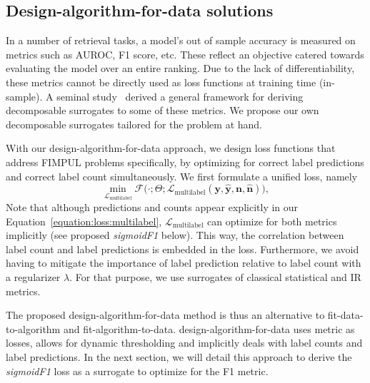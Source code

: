 \subsection{Design-algorithm-for-data solutions}
\label{section:background:solution}

In a number of retrieval tasks, a model's out of sample accuracy is measured
on metrics such as AUROC, F1 score, etc. These reflect an objective catered
towards evaluating the model over an entire ranking. Due to the lack of
differentiability, these metrics cannot be directly used as loss functions at
training time (in-sample). A seminal study~\cite{optimizableLosses} derived a
general framework for deriving decomposable surrogates to some of these
metrics. We propose our own decomposable surrogates tailored for the problem
at hand.

With our design-algorithm-for-data approach, we design loss functions that address FIMPUL problems specifically, by optimizing for correct label predictions and correct label count simultaneously.
We first formulate a unified loss, namely
%
\begin{equation}
\label{equation:loss:multilabel}
\underset{\mathcal{L}_{\text {multilabel}}} {\min} \mathcal{F}\big(\cdot ;
\Theta; \mathcal{L}_{\text {multilabel}} (\mathbf{y}, \hat{\mathbf{y}},
\mathbf{n}, \hat{\mathbf{n}}) \big),
\end{equation}
%
Note that although predictions and counts appear explicitly in our Equation~\ref{equation:loss:multilabel},
\(\mathcal{L}_{\text {multilabel}}\) can optimize for both metrics implicitly
(see proposed \emph{sigmoidF1} below). This way, the correlation between label count and label predictions is embedded in the loss. Furthermore, we avoid having to mitigate the importance of label prediction relative to label count with a regularizer $\lambda$. For that purpose, we use surrogates of classical statistical and \ac{IR} metrics.

The proposed design-algorithm-for-data method is thus an alternative to fit-data-to-algorithm and fit-algorithm-to-data. design-algorithm-for-data uses metric as losses, allows for dynamic thresholding and implicitly deals with label counts and label predictions. In the next section, we will detail this approach to derive the \emph{sigmoidF1} loss as a surrogate to optimize for the F1 metric.


